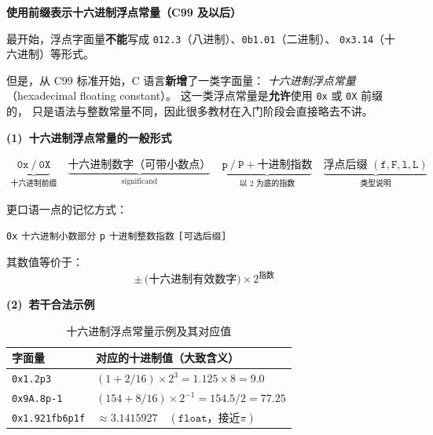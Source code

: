 \noindent\textbf{使用前缀表示十六进制浮点常量（C99 及以后）}
\vspace{0.8em}


最开始，浮点字面量\textbf{不能}写成 \verb|012.3|（八进制）、\verb|0b1.01|（二进制）、
\verb|0x3.14|（十六进制）等形式。

但是，从 C99 标准开始，C 语言\textbf{新增}了一类字面量：
\emph{十六进制浮点常量}（hexadecimal floating constant）。  
这一类浮点常量是\textbf{允许}使用 \verb|0x| 或 \verb|0X| 前缀的，
只是语法与整数常量不同，因此很多教材在入门阶段会直接略去不讲。

\vspace{1em}

\noindent\textbf{(1)~十六进制浮点常量的一般形式}\par\vspace{0.5em}

\[
\begin{aligned}
  \underbrace{\mathtt{0x}\ \mbox{/}\ \mathtt{0X}}_{\mbox{十六进制前缀}}
  \quad
  \underbrace{\mbox{十六进制数字（可带小数点）}}_{\mbox{significand}}
  \quad
  \underbrace{\mathtt{p}\ \mbox{/}\ \mathtt{P} + \mbox{十进制指数}}_{\mbox{以 2 为底的指数}}
  \quad
  \underbrace{\mbox{浮点后缀 }(\mathtt{f},\mathtt{F},\mathtt{l},\mathtt{L})}_{\mbox{类型说明}}
\end{aligned}
  \]

更口语一点的记忆方式：  
\begin{center}
\verb|0x| \texttt{十六进制小数部分} \verb|p| \texttt{十进制整数指数} \texttt{[可选后缀]}
\end{center}

\noindent
其数值等价于：
\[
  \pm\,\mbox{(十六进制有效数字)} \times 2^{\mbox{指数}}
\]

\newpage

\noindent\textbf{(2)~若干合法示例}\par\vspace{0.5em}

\begin{table}[H]
\centering
\caption{十六进制浮点常量示例及其对应值}\label{tab:hex-float}
\begin{tabular}{ll}
\toprule
字面量 & 对应的十进制值（大致含义） \\
\midrule
\verb|0x1.2p3|       & $(1 + 2/16) \times 2^{3} = 1.125 \times 8 = 9.0$ \\
\verb|0x9A.8p-1|     & $(154 + 8/16) \times 2^{-1} = 154.5 / 2 = 77.25$ \\
\verb|0x1.921fb6p1f| & $\approx 3.1415927\quad(\texttt{float}，接近 \pi)$ \\
\bottomrule
\end{tabular}
\end{table}






